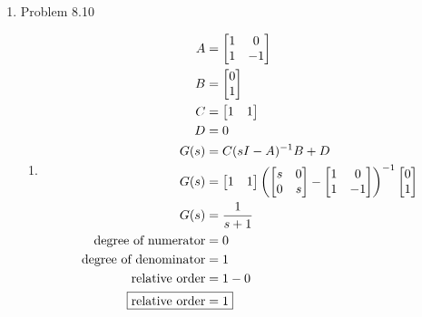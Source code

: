 \documentclass[12pt]{article}
\begin{document}
\begin{enumerate}
\newpage
    \item Problem 8.10
    \begin{enumerate}
        \item 
        \begin{align*}
            A &= \begin{bmatrix}
                1 & 0 \\
                1 & -1 \\
            \end{bmatrix} \\
            B &= \begin{bmatrix}
                0 \\
                1 \\
            \end{bmatrix} \\
            C &= \begin{bmatrix}
                1 & 1 \\
            \end{bmatrix} \\
            D &= 0 \\    
            G(s) &= C (s I - A)^{-1} B + D \\
            G(s) &= \begin{bmatrix}
                1 & 1 \\
            \end{bmatrix}
            \left(
                \begin{bmatrix}
                    s & 0 \\
                    0 & s \\
                \end{bmatrix} - 
                \begin{bmatrix}
                    1 & 0 \\
                    1 & -1 \\
                \end{bmatrix}
            \right)^{-1}
            \begin{bmatrix}
                0 \\
                1 \\
            \end{bmatrix} \\
            G(s) &= \frac{1}{s + 1} \\
            \text{degree of numerator} &= 0 \\
            \text{degree of denominator} &= 1 \\
            \text{relative order} &= 1 - 0 \\
            \Aboxed{\text{relative order} &= 1}
        \end{align*}


\end{enumerate}
\end{enumerate}
\end{document}
